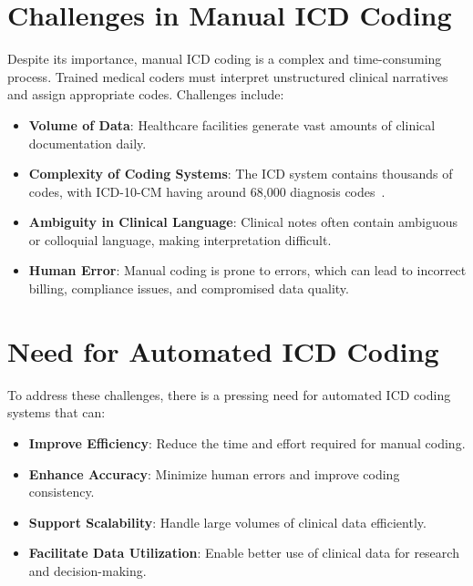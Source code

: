 \documentclass[12pt,a4paper]{report}
\begin{document}
\section{Challenges in Manual ICD Coding}
Despite its importance, manual ICD coding is a complex and time-consuming process. Trained medical coders must interpret unstructured clinical narratives and assign appropriate codes. Challenges include:
\begin{itemize}
    \item \textbf{Volume of Data}: Healthcare facilities generate vast amounts of clinical documentation daily.
    \item \textbf{Complexity of Coding Systems}: The ICD system contains thousands of codes, with ICD-10-CM having around 68,000 diagnosis codes~\cite{dong2022automated}.
    \item \textbf{Ambiguity in Clinical Language}: Clinical notes often contain ambiguous or colloquial language, making interpretation difficult.
    \item \textbf{Human Error}: Manual coding is prone to errors, which can lead to incorrect billing, compliance issues, and compromised data quality.
\end{itemize}

\section{Need for Automated ICD Coding}
To address these challenges, there is a pressing need for automated ICD coding systems that can:
\begin{itemize}
    \item \textbf{Improve Efficiency}: Reduce the time and effort required for manual coding.
    \item \textbf{Enhance Accuracy}: Minimize human errors and improve coding consistency.
    \item \textbf{Support Scalability}: Handle large volumes of clinical data efficiently.
    \item \textbf{Facilitate Data Utilization}: Enable better use of clinical data for research and decision-making.
\end{itemize}
\end{document}
